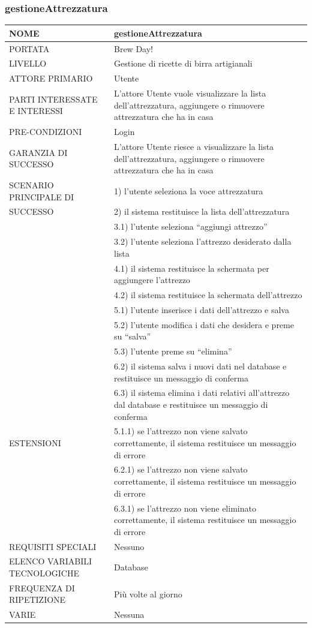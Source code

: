 \documentclass[a4paper, titlepage]{article}
\begin{document}
\subsubsection{gestioneAttrezzatura}
\begin{longtable}{p{6cm}p{7cm}}\toprule
    NOME & gestioneAttrezzatura\\\midrule
    PORTATA & Brew Day!\\\midrule
    LIVELLO & Gestione di ricette di birra artigianali\\\midrule
    ATTORE PRIMARIO & Utente\\\midrule
    PARTI INTERESSATE E INTERESSI &
    L’attore Utente vuole visualizzare la lista dell’attrezzatura, aggiungere o rimuovere attrezzatura che ha in casa \\\midrule
    PRE-CONDIZIONI & Login\\\midrule
    GARANZIA DI SUCCESSO & L’attore Utente riesce a visualizzare la lista dell’attrezzatura, aggiungere o rimuovere
    attrezzatura che ha in casa\\\midrule
    SCENARIO PRINCIPALE DI
    & 1) l’utente seleziona la voce attrezzatura\\
    SUCCESSO & 2) il sistema restituisce la lista dell’attrezzatura\\
    & 3.1) l’utente seleziona “aggiungi attrezzo”\\
    & 3.2) l’utente seleziona l'attrezzo desiderato dalla lista\\
    & 4.1) il sistema restituisce la schermata per aggiungere l'attrezzo\\
    & 4.2) il sistema restituisce la schermata dell'attrezzo\\
    & 5.1) l’utente inserisce i dati dell'attrezzo e salva\\
    & 5.2) l’utente modifica i dati che desidera e preme su “salva”\\
    & 5.3) l’utente preme su “elimina”\\
    & 6.2) il sistema salva i nuovi dati nel database e restituisce un messaggio di conferma\\
    & 6.3) il sistema elimina i dati relativi all'attrezzo dal database e restituisce un messaggio di conferma\\\midrule
    ESTENSIONI
    & 5.1.1) se l'attrezzo non viene salvato correttamente, il sistema restituisce un messaggio di errore\\
    & 6.2.1) se l'attrezzo non viene salvato correttamente, il sistema restituisce un messaggio di errore\\
    & 6.3.1) se l'attrezzo non viene eliminato correttamente, il sistema restituisce un messaggio di errore \\\midrule
    REQUISITI SPECIALI & Nessuno\\\midrule
    ELENCO VARIABILI TECNOLOGICHE & Database\\\midrule
    FREQUENZA DI RIPETIZIONE & Più volte al giorno\\\midrule
    VARIE & Nessuna\\\bottomrule
\end{longtable}
\vphantom{}
\end{document}
